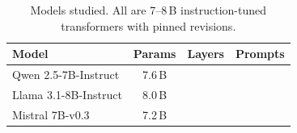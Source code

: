 \begin{table}[t]
  \caption{Models studied. All are 7--8\,B instruction-tuned transformers with pinned revisions.}
  \label{tab:models}
  \vskip 0.1in
  \begin{center}\begin{small}\begin{tabular}{lccc}
    \toprule
    Model & Params & Layers & Prompts \\
    \midrule
    Qwen 2.5-7B-Instruct  & 7.6\,B & \NLayersQwen{} & \NPromptsPerModel{} \\
    Llama 3.1-8B-Instruct  & 8.0\,B & \NLayersLlama{} & \NPromptsPerModel{} \\
    Mistral 7B-v0.3 & 7.2\,B & \NLayersMistral{} & \NPromptsPerModel{} \\
    \bottomrule
  \end{tabular}\end{small}\end{center}
\end{table}
